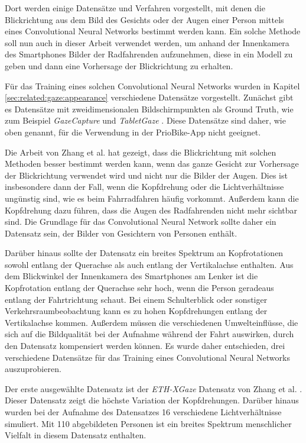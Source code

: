 Dort werden einige Datensätze und Verfahren vorgestellt, mit denen die Blickrichtung aus dem Bild des Gesichts oder der Augen einer Person mittels eines Convolutional Neural Networks bestimmt werden kann.
Ein solche Methode soll nun auch in dieser Arbeit verwendet werden, um anhand der Innenkamera des Smartphones Bilder der Radfahrenden aufzunehmen, diese in ein Modell zu geben und dann eine Vorhersage der Blickrichtung zu erhalten.

Für das Training eines solchen Convolutional Neural Networks wurden in Kapitel \ref{sec:related:gaze:appearance} verschiedene Datensätze vorgestellt. Zunächst gibt es Datensätze mit zweidimensionalen Bildschirmpunkten als Ground Truth, wie zum Beispiel \textit{GazeCapture} \cite{paper:gazecapture} und \textit{TabletGaze} \cite{paper:tabletgaze}. Diese Datensätze sind daher, wie oben genannt, für die Verwendung in der PrioBike-App nicht geeignet. 

Die Arbeit von Zhang et al. \cite{paper:mpiifacegaze} hat gezeigt, dass die Blickrichtung mit solchen Methoden besser bestimmt werden kann, wenn das ganze Gesicht zur Vorhersage der Blickrichtung verwendet wird und nicht nur die Bilder der Augen. Dies ist insbesondere dann der Fall, wenn die Kopfdrehung oder die Lichtverhältnisse ungünstig sind, wie es beim Fahrradfahren häufig vorkommt. Außerdem kann die Kopfdrehung dazu führen, dass die Augen des Radfahrenden nicht mehr sichtbar sind. Die Grundlage für das Convolutional Neural Network sollte daher ein Datensatz sein, der Bilder von Gesichtern von Personen enthält.

Darüber hinaus sollte der Datensatz ein breites Spektrum an Kopfrotationen sowohl entlang der Querachse als auch entlang der Vertikalachse enthalten. Aus dem Blickwinkel der Innenkamera des Smartphones am Lenker ist die Kopfrotation entlang der Querachse sehr hoch, wenn die Person geradeaus entlang der Fahrtrichtung schaut. Bei einem Schulterblick oder sonstiger Verkehrsraumbeobachtung kann es zu hohen Kopfdrehungen entlang der Vertikalachse kommen. Außerdem müssen die verschiedenen Umwelteinflüsse, die sich auf die Bildqualität bei der Aufnahme während der Fahrt auswirken, durch den Datensatz kompensiert werden können. Es wurde daher entschieden, drei verschiedene Datensätze für das Training eines Convolutional Neural Networks auszuprobieren.

Der erste ausgewählte Datensatz ist der \textit{ETH-XGaze} Datensatz von Zhang et al. \cite{paper:eth-xgaze}. Dieser Datensatz zeigt die höchste Variation der Kopfdrehungen. Darüber hinaus wurden bei der Aufnahme des Datensatzes 16 verschiedene Lichtverhältnisse simuliert. Mit 110 abgebildeten Personen ist ein breites Spektrum menschlicher Vielfalt in diesem Datensatz enthalten.

